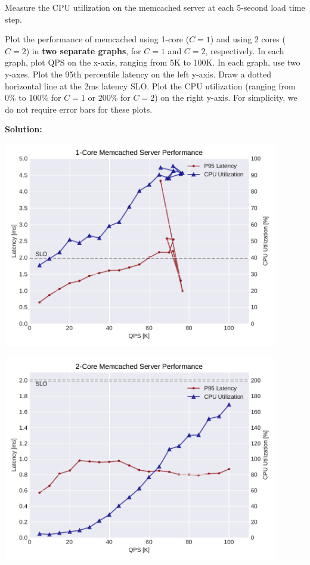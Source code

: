 \documentclass[11pt]{article}
\begin{document}
\begin{enumerate}
    Measure the CPU utilization on the memcached server at each 5-second load time step.
    
    Plot the performance of memcached using 1-core ($C=1$) and using 2 cores ($C=2$) in \textbf{two separate graphs}, for $C=1$ and $C=2$,  respectively. In each graph, plot QPS on the x-axis, ranging from 5K to 100K. In each graph, use two y-axes. Plot the 95th percentile latency on the left y-axis. Draw a dotted horizontal line at the 2ms latency SLO. Plot the CPU utilization (ranging from 0\% to 100\% for $C=1$ or 200\% for $C=2$) on the right y-axis. For simplicity, we do not require error bars for these plots. 
    
    \textbf{Solution:}
    \begin{center}
    {\includegraphics[width=0.9\textwidth]{c1.pdf}}
    \end{center}
    \begin{center}
    {\includegraphics[width=0.9\textwidth]{c2.pdf}}
    \end{center}
    

\end{enumerate}
\end{document}
